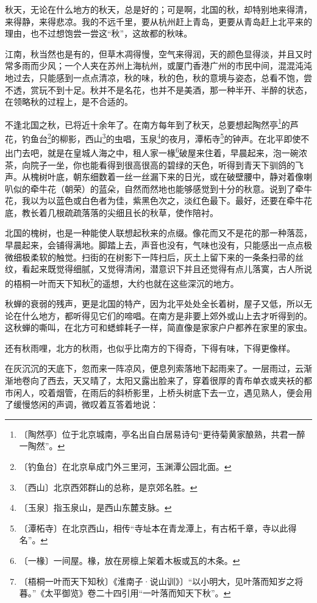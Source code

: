 \documentclass[12pt,UTF-8,openany]{ctexbook}
\begin{document}
\begin{normalsize}
    
    秋天，无论在什么地方的秋天，总是好的；可是啊，北国的秋，却特别地来得清，来得静，来得悲凉。我的不远千里，要从杭州赶上青岛，更要从青岛赶上北平来的理由，也不过想饱尝一尝这“秋”，这故都的秋味。
    
    江南，秋当然也是有的，但草木凋得慢，空气来得润，天的颜色显得淡，并且又时常多雨而少风；一个人夹在苏州上海杭州，或厦门香港广州的市民中间，混混沌沌地过去，只能感到一点点清凉，秋的味，秋的色，秋的意境与姿态，总看不饱，尝不透，赏玩不到十足。秋并不是名花，也并不是美酒，那一种半开、半醉的状态，在领略秋的过程上，是不合适的。
    
    不逢北国之秋，已将近十余年了。在南方每年到了秋天，总要想起陶然亭\footnote{〔陶然亭〕位于北京城南，亭名出自白居易诗句“更待菊黄家酿熟，共君一醉一陶然”。}的芦花，钓鱼台\footnote{〔钓鱼台〕在北京阜成门外三里河，玉渊潭公园北面。}的柳影，西山\footnote{〔西山〕北京西郊群山的总称，是京郊名胜。}的虫唱，玉泉\footnote{〔玉泉〕指玉泉山，是西山东麓支脉。}的夜月，潭柘寺\footnote{〔潭柘寺〕在北京西山，相传“寺址本在青龙潭上，有古柘千章，寺以此得名”。}的钟声。在北平即使不出门去吧，就是在皇城人海之中，租人家一椽\footnote{〔一椽〕一间屋。椽，放在房檩上架着木板或瓦的木条。}破屋来住着，早晨起来，泡一碗浓茶，向院子一坐，你也能看得到很高很高的碧绿的天色，听得到青天下驯鸽的飞声。从槐树叶底，朝东细数着一丝一丝漏下来的日光，或在破壁腰中，静对着像喇叭似的牵牛花（朝荣）的蓝朵，自然而然地也能够感觉到十分的秋意。说到了牵牛花，我以为以蓝色或白色者为佳，紫黑色次之，淡红色最下。最好，还要在牵牛花底，教长着几根疏疏落落的尖细且长的秋草，使作陪衬。
    
    北国的槐树，也是一种能使人联想起秋来的点缀。像花而又不是花的那一种落蕊，早晨起来，会铺得满地。脚踏上去，声音也没有，气味也没有，只能感出一点点极微细极柔软的触觉。扫街的在树影下一阵扫后，灰土上留下来的一条条扫帚的丝纹，看起来既觉得细腻，又觉得清闲，潜意识下并且还觉得有点儿落寞，古人所说的梧桐一叶而天下知秋\footnote{〔梧桐一叶而天下知秋〕《淮南子·说山训》〕“以小明大，见叶落而知岁之将暮。”《太平御览》卷二十四引用“一叶落而知天下秋”。}的遥想，大约也就在这些深沉的地方。
    
    秋蝉的衰弱的残声，更是北国的特产，因为北平处处全长着树，屋子又低，所以无论在什么地方，都听得见它们的啼唱。在南方是非要上郊外或山上去才听得到的。这秋蝉的嘶叫，在北方可和蟋蟀耗子一样，简直像是家家户户都养在家里的家虫。
    
    还有秋雨哩，北方的秋雨，也似乎比南方的下得奇，下得有味，下得更像样。
    
    在灰沉沉的天底下，忽而来一阵凉风，便息列索落地下起雨来了。一层雨过，云渐渐地卷向了西去，天又晴了，太阳又露出脸来了，穿着很厚的青布单衣或夹袄的都市闲人，咬着烟管，在雨后的斜桥影里，上桥头树底下去一立，遇见熟人，便会用了缓慢悠闲的声调，微叹着互答着地说：
    

\end{normalsize}
\end{document}
